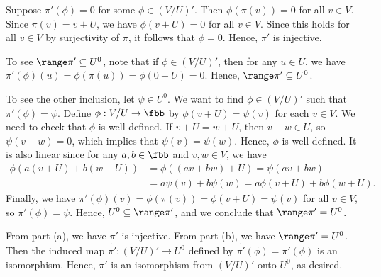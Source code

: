 \begin{solenum}
    \item Suppose $\pi'(\phi) = 0$ for some $\phi \in (V / U)'$.
	Then $\phi(\pi(v)) = 0$ for all $v \in V$.
	Since $\pi(v) = v + U$, we have $\phi(v + U) = 0$ for all $v \in V$.
	Since this holds for all $v \in V$ by surjectivity of $\pi$, it follows that $\phi = 0$.
	Hence, $\pi'$ is injective.
    \item To see $\range \pi' \subseteq U^0$, note that if $\phi \in (V / U)'$, then for any $u \in U$, we have $\pi'( \phi)(u) = \phi(\pi(u)) = \phi(0 + U) = 0$.
	Hence, $\range \pi' \subseteq U^0$.
    
    To see the other inclusion, let $\psi \in U^0$.
	We want to find $\phi \in (V / U)'$ such that $\pi'(\phi) = \psi$.
	Define $\phi: V / U \to \fbb$ by $\phi(v + U) = \psi(v)$ for each $v \in V$.
	We need to check that $\phi$ is well-defined.
	If $v + U = w + U$, then $v - w \in U$, so $\psi(v - w) = 0$, which implies that $\psi(v) = \psi(w)$.
	Hence, $\phi$ is well-defined.
	It is also linear since for any $a, b \in \fbb$ and $v, w \in V$, we have
    \begin{align*}
        \phi(a(v + U) + b(w + U)) &= \phi((av + bw) + U) = \psi(av + bw) \\
        &= a \psi(v) + b \psi(w) = a \phi(v + U) + b \phi(w + U).
    \end{align*}
    Finally, we have $\pi'(\phi)(v) = \phi(\pi(v)) = \phi(v + U) = \psi(v)$ for all $v \in V$, so $\pi'(\phi) = \psi$.
	Hence, $U^0 \subseteq \range \pi'$, and we conclude that $\range \pi' = U^0$.
    \item From part (a), we have $\pi'$ is injective.
	From part (b), we have $\range \pi' = U^0$.
	Then the induced map $\tilde{\pi'}: (V / U)' \to U^0$ defined by $\tilde{\pi'}(\phi) = \pi'(\phi)$ is an isomorphism.
	Hence, $\pi'$ is an isomorphism from $(V / U)'$ onto $U^0$, as desired.
\end{solenum}